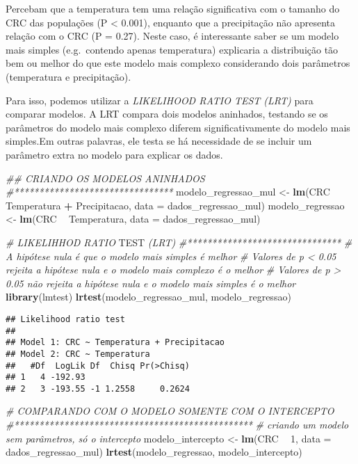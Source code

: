 \documentclass[
]{book}
\newenvironment{Shaded}{\begin{snugshade}}{\end{snugshade}}
\newcommand{\AlertTok}[1]{\textcolor[rgb]{0.94,0.16,0.16}{#1}}
\newcommand{\CommentTok}[1]{\textcolor[rgb]{0.56,0.35,0.01}{\textit{#1}}}
\newcommand{\DataTypeTok}[1]{\textcolor[rgb]{0.13,0.29,0.53}{#1}}
\newcommand{\DecValTok}[1]{\textcolor[rgb]{0.00,0.00,0.81}{#1}}
\newcommand{\KeywordTok}[1]{\textcolor[rgb]{0.13,0.29,0.53}{\textbf{#1}}}
\newcommand{\NormalTok}[1]{#1}
\newcommand{\OperatorTok}[1]{\textcolor[rgb]{0.81,0.36,0.00}{\textbf{#1}}}
\newcommand{\StringTok}[1]{\textcolor[rgb]{0.31,0.60,0.02}{#1}}
\begin{document}
Percebam que a temperatura tem uma relação significativa com o tamanho do CRC das populações (P \textless{} 0.001), enquanto que a precipitação não apresenta relação com o CRC (P = 0.27). Neste caso, é interessante saber se um modelo mais simples (e.g.~contendo apenas temperatura) explicaria a distribuição tão bem ou melhor do que este modelo mais complexo considerando dois parâmetros (temperatura e precipitação).

Para isso, podemos utilizar a \emph{LIKELIHOOD RATIO TEST (LRT)} para comparar modelos. A LRT compara dois modelos aninhados, testando se os parâmetros do modelo mais complexo diferem significativamente do modelo mais simples.Em outras palavras, ele testa se há necessidade de se incluir um parâmetro extra no modelo para explicar os dados.

\begin{Shaded}
\begin{Highlighting}[]
\CommentTok{## CRIANDO OS MODELOS ANINHADOS}
\CommentTok{#********************************}
\NormalTok{modelo_regressao_mul <-}\StringTok{ }\KeywordTok{lm}\NormalTok{(CRC }\OperatorTok{~}\StringTok{ }\NormalTok{Temperatura }\OperatorTok{+}\StringTok{ }\NormalTok{Precipitacao, }\DataTypeTok{data =}\NormalTok{ dados_regressao_mul)}
\NormalTok{modelo_regressao <-}\StringTok{ }\KeywordTok{lm}\NormalTok{(CRC }\OperatorTok{~}\StringTok{ }\NormalTok{Temperatura, }\DataTypeTok{data =}\NormalTok{ dados_regressao_mul)}

\CommentTok{# LIKELIHHOD RATIO }\AlertTok{TEST}\CommentTok{ (LRT)}
\CommentTok{#*******************************}
\CommentTok{# A hipótese nula é que o modelo mais simples é melhor}
\CommentTok{# Valores de p < 0.05 rejeita a hipótese nula e o modelo mais complexo é o melhor}
\CommentTok{# Valores de p > 0.05 não rejeita a hipótese nula e o modelo mais simples é o melhor}
\KeywordTok{library}\NormalTok{(lmtest)}
\KeywordTok{lrtest}\NormalTok{(modelo_regressao_mul, modelo_regressao)}
\end{Highlighting}
\end{Shaded}

\begin{verbatim}
## Likelihood ratio test
## 
## Model 1: CRC ~ Temperatura + Precipitacao
## Model 2: CRC ~ Temperatura
##   #Df  LogLik Df  Chisq Pr(>Chisq)
## 1   4 -192.93                     
## 2   3 -193.55 -1 1.2558     0.2624
\end{verbatim}

\begin{Shaded}
\begin{Highlighting}[]
\CommentTok{# COMPARANDO COM O MODELO SOMENTE COM O INTERCEPTO}
\CommentTok{#************************************************}
\CommentTok{# criando um modelo sem parâmetros, só o intercepto}
\NormalTok{modelo_intercepto <-}\StringTok{ }\KeywordTok{lm}\NormalTok{(CRC }\OperatorTok{~}\StringTok{ }\DecValTok{1}\NormalTok{, }\DataTypeTok{data =}\NormalTok{ dados_regressao_mul)}
\KeywordTok{lrtest}\NormalTok{(modelo_regressao, modelo_intercepto)}
\end{Highlighting}
\end{Shaded}
\end{document}
